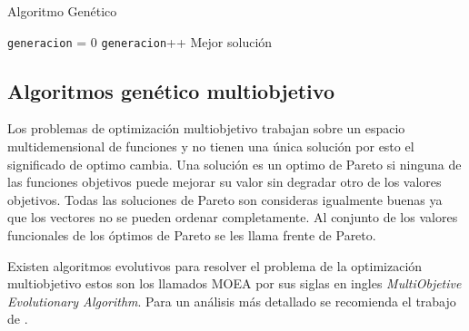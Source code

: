 \begin{algorithm}%
	\caption{Algoritmo Genético}
	\label{alg:algoritmo_genetico_simple}
	\begin{algorithmic} [1] 
		{
			\STATE \texttt{generacion} = 0
			\STATE \texttt{generacion}++
			\ENDWHILE
			\RETURN Mejor solución
		}
	\end{algorithmic}
\end{algorithm}



%
%


\subsection{Algoritmos genético multiobjetivo}

Los problemas de optimización multiobjetivo trabajan sobre un espacio multidemensional de funciones y no tienen una única solución por esto el significado de optimo cambia. Una solución es un optimo de Pareto si ninguna de las funciones objetivos puede mejorar su valor sin degradar otro de los valores objetivos. Todas las soluciones de Pareto son consideras igualmente buenas ya que los vectores no se pueden ordenar completamente. Al conjunto de los valores funcionales de los óptimos de Pareto se les llama frente de Pareto.

Existen algoritmos evolutivos para resolver el problema de la optimización multiobjetivo estos son los llamados MOEA por sus siglas en ingles \emph{ MultiObjetive Evolutionary Algorithm}. Para un análisis más detallado se recomienda el trabajo de \citet{Deb2001}.

